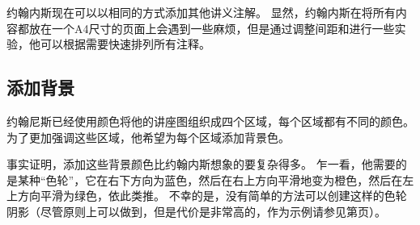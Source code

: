 
约翰内斯现在可以以相同的方式添加其他讲义注解。 显然，约翰内斯在将所有内容都放在一个A4尺寸的页面上会遇到一些麻烦，但是通过调整间距和进行一些实验，他可以根据需要快速排列所有注释。


\subsection{添加背景}


约翰尼斯已经使用颜色将他的讲座图组织成四个区域，每个区域都有不同的颜色。 为了更加强调这些区域，他希望为每个区域添加背景色。


事实证明，添加这些背景颜色比约翰内斯想象的要复杂得多。 乍一看，他需要的是某种``色轮''，它在右下方向为蓝色，然后在右上方向平滑地变为橙色，然后在左上方向平滑为绿色，依此类推。 不幸的是，没有简单的方法可以创建这样的色轮阴影（尽管原则上可以做到，但是代价是非常高的，作为示例请参见第\pageref{shading-color-wheel}页）。


